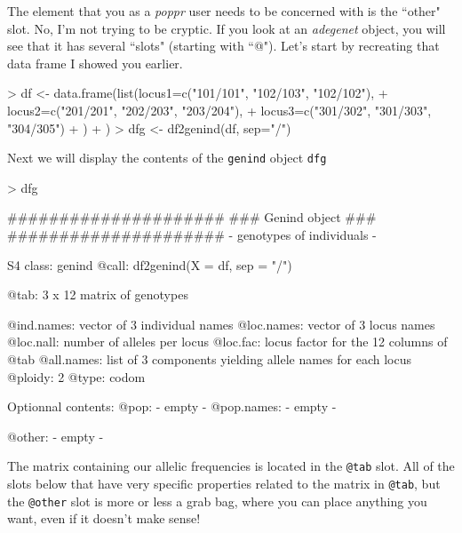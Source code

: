 \documentclass[letterpaper]{article}
\newcommand{\tab}{\hspace*{1em}}
\begin{document}
\tab\tab The element that you as a \textit{poppr} user needs to be concerned with is the ``other" slot. No, I'm not trying to be cryptic. If you look at an \textit{adegenet} object, you will see that it has several ``slots" (starting with ``@"). \cite{Jombart:2008} Let's start by recreating that data frame I showed you earlier.
\begin{Schunk}
\begin{Sinput}
> df <- data.frame(list(locus1=c("101/101", "102/103", "102/102"), 
+                       locus2=c("201/201", "202/203", "203/204"), 
+                       locus3=c("301/302", "301/303", "304/305")
+                       )
+                  )
> dfg <- df2genind(df, sep="/")
\end{Sinput}
\end{Schunk}
Next we will display the contents of the \texttt{genind} object \texttt{dfg}
\begin{Schunk}
\begin{Sinput}
> dfg
\end{Sinput}
\begin{Soutput}
   #####################
   ### Genind object ### 
   #####################
- genotypes of individuals - 

S4 class:  genind
@call: df2genind(X = df, sep = "/")

@tab:  3 x 12 matrix of genotypes

@ind.names: vector of  3 individual names
@loc.names: vector of  3 locus names
@loc.nall: number of alleles per locus
@loc.fac: locus factor for the  12 columns of @tab
@all.names: list of  3 components yielding allele names for each locus
@ploidy:  2
@type:  codom

Optionnal contents: 
@pop:  - empty -
@pop.names:  - empty -

@other: - empty -
\end{Soutput}
\end{Schunk}

The matrix containing our allelic frequencies is located in the \texttt{@tab} slot. All of the  slots below that have very specific properties related to the matrix in \texttt{@tab}, but the \texttt{@other} slot is more or less a grab bag, where you can place anything you want, even if it doesn't make sense!
\end{document}

